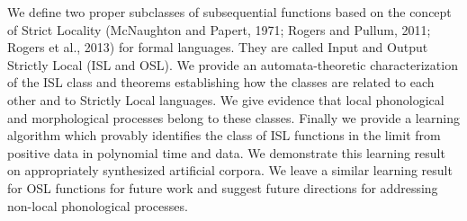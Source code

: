 We define two proper subclasses of subsequential functions based on the concept of Strict Locality (McNaughton and Papert, 1971; Rogers and Pullum, 2011; Rogers et al., 2013) for formal languages. They are called Input and Output Strictly Local (ISL and OSL). We provide an automata-theoretic characterization of the ISL class and theorems establishing how the classes are related to each other and to Strictly Local languages. We give evidence that local phonological and morphological processes belong to these classes. Finally we provide a learning algorithm which provably identifies the class of ISL functions in the limit from positive data in polynomial time and data. We demonstrate this learning result on appropriately synthesized artificial corpora. We leave a similar learning result for OSL functions for future work and suggest future directions for addressing non-local phonological processes.